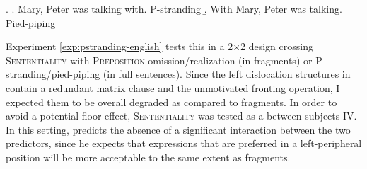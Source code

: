 \ex. \a. Mary, Peter was talking with. \hfill P-stranding
    \b. With Mary, Peter was talking. \hfill Pied-piping

Experiment \ref{exp:pstranding-english} tests this in a 2$\times$2 design crossing \textsc{Sententiality} with \textsc{Preposition} omission/realization (in fragments) or P-stranding/pied-piping (in full sentences). Since the left dislocation structures in \Last contain a redundant matrix clause and the unmotivated fronting operation, I expected them to be overall degraded as compared to fragments. In order to avoid a potential floor effect, \textsc{Sententiality} was tested as a between subjects IV. In this setting, \citet{merchant2004} predicts the absence of a significant interaction between the two predictors, since he expects that expressions that are preferred in a left-peripheral position will be more acceptable to the same extent as fragments.

